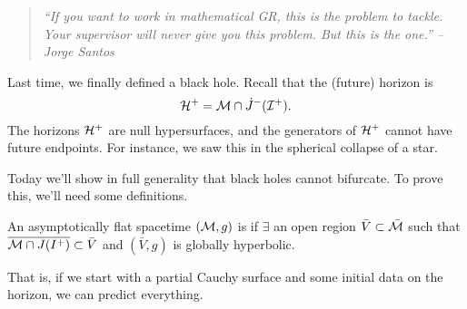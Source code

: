 \begin{quote}
    \textit{``If you want to work in mathematical GR, this is the problem to tackle. Your supervisor will never give you this problem. But this is the one.'' --Jorge Santos}
\end{quote}

Last time, we finally defined a black hole.
Recall that the (future) horizon is
\begin{equation*}
    \mathcal H^+ = \mathcal{M} \cap \dot J^{-}(\mathcal{I}^+).
\end{equation*}
The horizons $\mathcal H^+$ are null hypersurfaces, and the generators of $\mathcal H^+$ cannot have future endpoints. For instance, we saw this in the spherical collapse of a star.

Today we'll show in full generality that black holes cannot bifurcate. To prove this, we'll need some definitions.
\begin{defn}
    An asymptotically flat spacetime $(\mathcal{M},g)$ is  if $\exists$ an open region $\bar V \subset \bar {\mathcal{M}}$ such that $\overline{\mathcal{M} \cap J (I^+)} \subset \bar V$ and $(\bar V, g)$ is globally hyperbolic.
\end{defn}
That is, if we start with a partial Cauchy surface and some initial data on the horizon, we can predict everything.

